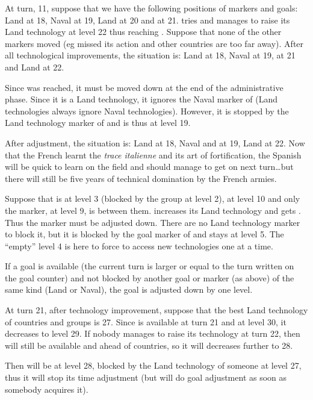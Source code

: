 \begin{exemple}
  At turn, 11, suppose that we have the following positions of markers and
  goals: Land \SPA at 18, Naval \VEN at 19, Land \FRA at 20 and \TARQ at
  21. \FRA tries and manages to raise its Land technology at level 22 thus
  reaching \TARQ. Suppose that none of the other markers moved (eg \SPA missed
  its action and other countries are too far away). After all technological
  improvements, the situation is: Land \SPA at 18, Naval \VEN at 19, \TARQ at
  21 and Land \FRA at 22.

  Since \TARQ was reached, it must be moved down at the end of the
  administrative phase. Since it is a Land technology, it ignores the Naval
  marker of \VEN (Land technologies always ignore Naval
  technologies). However, it is stopped by the Land technology marker of \SPA
  and is thus at level 19.

  After adjustment, the situation is: Land \SPA at 18, Naval \VEN and \TARQ at
  19, Land \FRA at 22. Now that the French learnt the \emph{trace italienne}
  and its art of fortification, the Spanish will be quick to learn on the
  field and should manage to get \TARQ on next turn\ldots but there will still
  be five years of technical domination by the French armies.
\end{exemple}

\begin{exemple}
  Suppose that \TREN is at level 3 (blocked by the \ROTW group at level 2),
  \TARQ at level 10 and only the \RUS marker, at level 9, is between
  them. \RUS increases its Land technology and gets \TARQ. Thus the marker
  must be adjusted down. There are no Land technology marker to block it, but
  it is blocked by the goal marker of \TREN and stays at level 5. The
  ``empty'' level 4 is here to force \ROTW to access new technologies one at a
  time.
\end{exemple}

 If a goal is available (the current turn is larger or
equal to the turn written on the goal counter) and not blocked by another goal
or marker (as above) of the same kind (Land or Naval), the goal is adjusted
down by one level.

\begin{exemple}
  At turn 21, after technology improvement, suppose that the best Land
  technology of countries and groups is 27. Since \TMUS is available at turn
  21 and at level 30, it decreases to level 29. If nobody manages to raise its
  technology at turn 22, then \TMUS will still be available and ahead of
  countries, so it will decreases further to 28.

  Then \TMUS will be at level 28, blocked by the Land technology of someone at
  level 27, thus it will stop its time adjustment (but will do goal adjustment
  as soon as somebody acquires it).
\end{exemple}

